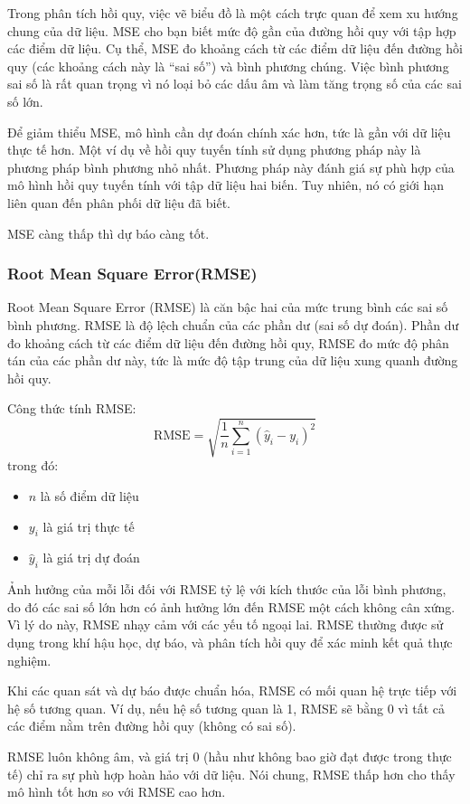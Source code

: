 \documentclass{article}
\begin{document}
\begin{multicols}{2}
Trong phân tích hồi quy, việc vẽ biểu đồ là một cách trực quan để xem xu hướng chung của dữ liệu. MSE cho bạn biết mức độ gần của đường hồi quy với tập hợp các điểm dữ liệu. Cụ thể, MSE đo khoảng cách từ các điểm dữ liệu đến đường hồi quy (các khoảng cách này là “sai số”) và bình phương chúng. Việc bình phương sai số là rất quan trọng vì nó loại bỏ các dấu âm và làm tăng trọng số của các sai số lớn.

Để giảm thiểu MSE, mô hình cần dự đoán chính xác hơn, tức là gần với dữ liệu thực tế hơn. Một ví dụ về hồi quy tuyến tính sử dụng phương pháp này là phương pháp bình phương nhỏ nhất. Phương pháp này đánh giá sự phù hợp của mô hình hồi quy tuyến tính với tập dữ liệu hai biến. Tuy nhiên, nó có giới hạn liên quan đến phân phối dữ liệu đã biết.

MSE càng thấp thì dự báo càng tốt.


\subsubsection{Root Mean Square Error(RMSE)}


Root Mean Square Error (RMSE) là căn bậc hai của mức trung bình các sai số bình phương. RMSE là độ lệch chuẩn của các phần dư (sai số dự đoán). Phần dư đo khoảng cách từ các điểm dữ liệu đến đường hồi quy, RMSE đo mức độ phân tán của các phần dư này, tức là mức độ tập trung của dữ liệu xung quanh đường hồi quy.

Công thức tính RMSE:
\[
\text{RMSE} = \sqrt{\frac{1}{n} \sum_{i=1}^{n} (\hat{y}_i - y_i)^2}
\]
trong đó:
\begin{itemize}
    \item $n$ là số điểm dữ liệu
    \item $y_i$ là giá trị thực tế
    \item $\hat{y}_i$ là giá trị dự đoán
\end{itemize}

Ảnh hưởng của mỗi lỗi đối với RMSE tỷ lệ với kích thước của lỗi bình phương, do đó các sai số lớn hơn có ảnh hưởng lớn đến RMSE một cách không cân xứng. Vì lý do này, RMSE nhạy cảm với các yếu tố ngoại lai. RMSE thường được sử dụng trong khí hậu học, dự báo, và phân tích hồi quy để xác minh kết quả thực nghiệm.

Khi các quan sát và dự báo được chuẩn hóa, RMSE có mối quan hệ trực tiếp với hệ số tương quan. Ví dụ, nếu hệ số tương quan là 1, RMSE sẽ bằng 0 vì tất cả các điểm nằm trên đường hồi quy (không có sai số).

RMSE luôn không âm, và giá trị 0 (hầu như không bao giờ đạt được trong thực tế) chỉ ra sự phù hợp hoàn hảo với dữ liệu. Nói chung, RMSE thấp hơn cho thấy mô hình tốt hơn so với RMSE cao hơn.


\end{multicols}
\end{document}
